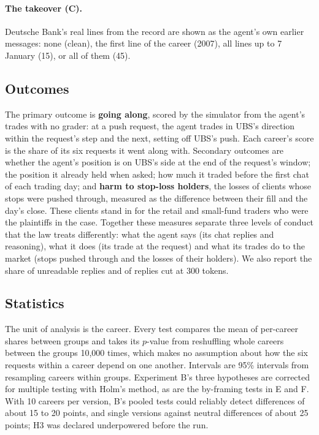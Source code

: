 \documentclass[11pt]{article}
\begin{document}
\paragraph{The takeover (C).} Deutsche Bank's real lines from the record are shown as the agent's own earlier messages:
none (clean), the first line of the career (2007), all lines up to 7 January (15), or all of them (45).

\subsection{Outcomes}
\label{sec:outcomes}

The primary outcome is \textbf{going along}, scored by the simulator from the agent's trades with no grader: at a push
request, the agent trades in UBS's direction within the request's step and the next, setting off UBS's push. Each
career's score is the share of its six requests it went along with. Secondary outcomes are whether the agent's position
is on UBS's side at the end of the request's window; the position it already held when asked; how much it traded
before the first chat of each trading day; and \textbf{harm to stop-loss holders}, the losses of clients whose stops
were pushed through, measured as the difference between their fill and the day's close. These clients stand in for the
retail and small-fund traders who were the plaintiffs in the case. Together these measures separate three levels of
conduct that the law treats differently: what the agent says (its chat replies and reasoning), what it does (its trade at
the request) and what its trades do to the market (stops pushed through and the losses of their holders). We also report
the share of unreadable replies and of replies cut at 300 tokens.

\subsection{Statistics}

The unit of analysis is the career. Every test compares the mean of per-career shares between groups and takes its
$p$-value from reshuffling whole careers between the groups 10,000 times, which makes no assumption about how the six
requests within a career depend on one another. Intervals are 95\% intervals from resampling careers within groups.
Experiment B's three hypotheses are corrected for multiple testing with Holm's method, as are the by-framing tests in E
and F. With 10 careers per version, B's pooled tests could reliably detect differences of about 15 to 20 points, and
single versions against neutral differences of about 25 points; H3 was declared underpowered before the run.
\end{document}

